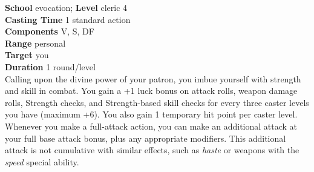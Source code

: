 \textbf{School} evocation; \textbf{Level }cleric 4\\
\textbf{Casting Time} 1 standard action\\
\textbf{Components} V, S, DF\\
\textbf{Range} personal\\
\textbf{Target} you\\
\textbf{Duration} 1 round/level\\
Calling upon the divine power of your patron, you imbue yourself with strength and skill in combat. You gain a +1 luck bonus on attack rolls, weapon damage rolls, Strength checks, and Strength-based skill checks for every three caster levels you have (maximum +6). You also gain 1 temporary hit point per caster level. Whenever you make a full-attack action, you can make an additional attack at your full base attack bonus, plus any appropriate modifiers. This additional attack is not cumulative with similar effects, such as \textit{haste} or weapons with the \textit{speed} special ability.\\
